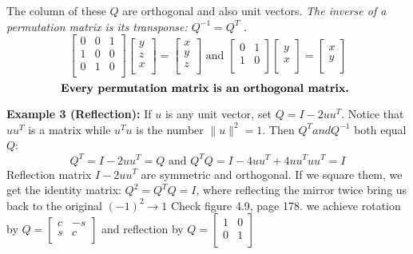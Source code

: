 The column of these \(Q\) are orthogonal and also unit vectors. \emph{The inverse of a permutation matrix is its transponse: \(Q^{-1} = Q^T \) }. 
\[
    \begin{bmatrix}
        0 & 0 & 1  \\
        1 & 0 & 0  \\
        0 & 1 & 0  \\
    \end{bmatrix}
    \begin{bmatrix}
         y \\
         z \\
         x \\
    \end{bmatrix}
    = 
    \begin{bmatrix}
         x \\
         y \\
         z \\
    \end{bmatrix}
    \text{ and }
    \begin{bmatrix}
        0 & 1  \\
        1 &  0 \\
    \end{bmatrix}
    \begin{bmatrix}
         y \\
         x \\
    \end{bmatrix}
    = 
    \begin{bmatrix}
         x \\
         y \\
    \end{bmatrix}
\]  
\[
    \text{\textbf{Every permutation matrix is an orthogonal matrix.} }
\]

\textbf{Example 3 (Reflection):} If \(u\) is any unit vector, set \(Q = I - 2uu^T\). Notice that \(uu^T\) is a matrix while \(u^T u\) is the number \(\lVert u \rVert^2 = 1 \). Then \(Q^T and Q^{-1} \) both equal \(Q\): 
\[
    Q^T = I - 2uu^T = Q 
    \text{ and }
    Q^T Q = I - 4uu^T + 4uu^T uu^T = I 
\]        
Reflection matrix \(I - 2uu^T\) are symmetric and orthogonal. If we square them, we get the identity matrix: \(Q^2 = Q^T Q = I\), where reflecting the mirror twice bring us back to the original \((-1)^2 \rightarrow 1\) 
Check figure 4.9, page 178. we achieve rotation by \(Q = \begin{bmatrix}
    c & -s  \\
    s & c  \\
\end{bmatrix}\) and reflection by \(Q = \begin{bmatrix}
    1 & 0  \\
    0 & 1 \\
\end{bmatrix}\) 

